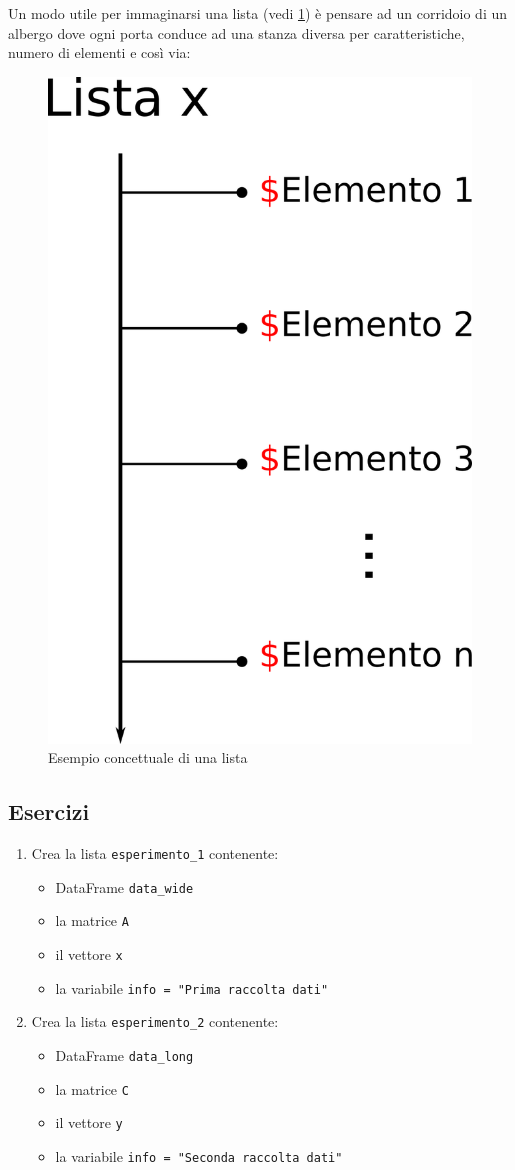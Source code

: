 \documentclass[
]{book}
\providecommand{\tightlist}{%
  \setlength{\itemsep}{0pt}\setlength{\parskip}{0pt}}
\begin{document}
Un modo utile per immaginarsi una lista (vedi \ref{fig:list-example}) è pensare ad un corridoio di un albergo dove ogni porta conduce ad una stanza diversa per caratteristiche, numero di elementi e così via:

\begin{figure}

{\centering \includegraphics[width=0.3\linewidth,height=0.3\textheight]{images/list_example} 

}

\caption{Esempio concettuale di una lista}\label{fig:list-example}
\end{figure}

\hypertarget{esercizi-11}{%
\subsection*{Esercizi}\label{esercizi-11}}

\begin{enumerate}
\def\labelenumi{\arabic{enumi}.}
\tightlist
\item
  Crea la lista \texttt{esperimento\_1} contenente:

  \begin{itemize}
  \tightlist
  \item
    DataFrame \texttt{data\_wide}
  \item
    la matrice \texttt{A}
  \item
    il vettore \texttt{x}
  \item
    la variabile \texttt{info\ =\ "Prima\ raccolta\ dati"}
  \end{itemize}
\item
  Crea la lista \texttt{esperimento\_2} contenente:

  \begin{itemize}
  \tightlist
  \item
    DataFrame \texttt{data\_long}
  \item
    la matrice \texttt{C}
  \item
    il vettore \texttt{y}
  \item
    la variabile \texttt{info\ =\ "Seconda\ raccolta\ dati"}
  \end{itemize}
\end{enumerate}
\end{document}
